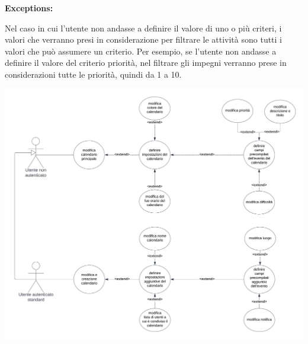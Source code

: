 \begin{listaPersonale}[UC]{}
\begin{enumerate}
    \end{enumerate}

    \textbf{Exceptions:}
    \begin{enumerate}[label=\textbf{[exception \arabic{enumii}]}, ref= \textbf{[exception \arabic{enumii}]}]
         Nel caso in cui l'utente non andasse a definire il valore di uno o più criteri, i valori che verranno presi in considerazione per filtrare le attività sono tutti i valori che può assumere un criterio. Per esempio, se l'utente non andasse a definire il valore del criterio priorità, nel filtrare gli impegni verranno prese in considerazioni tutte le priorità, quindi da 1 a 10.
    \end{enumerate}




    \newpage


    \begin{center}
        \includegraphics[width=1\textwidth]{img/Diagrammi/UseCases/ImpostazioniPredefiniteCalendario.png}
    \end{center}


\end{listaPersonale}
